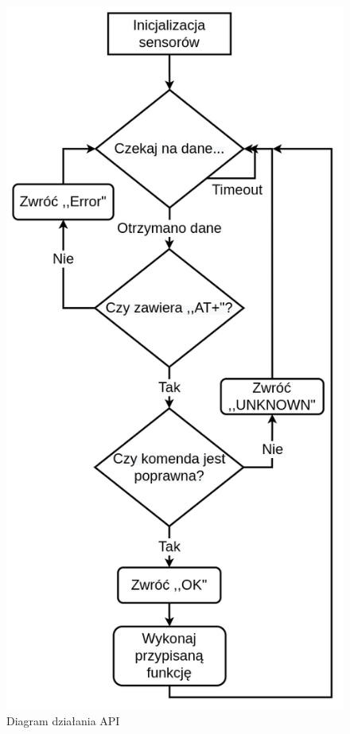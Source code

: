 \begin{figure}[H]
    \centering
    \includegraphics[width=\textwidth, height=\textheight, keepaspectratio]{Graphics/API_Sensors.png}
    \caption{Diagram działania API}
    \label{img:api_diagram}
\end{figure}


